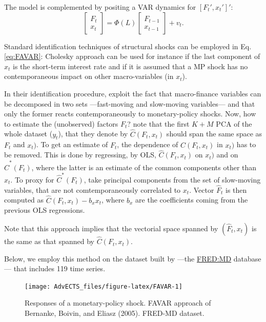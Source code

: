 \documentclass[
]{book}
\theoremstyle{definition}
\theoremstyle{definition}
\theoremstyle{definition}
\theoremstyle{definition}
\theoremstyle{remark}
\begin{document}
The model is complemented by positing a VAR dynamics for \([F_t',x_t']'\):
\begin{equation}
\left[\begin{array}{c}F_t\\x_t\end{array}\right] = \Phi(L)\left[\begin{array}{c}F_{t-1}\\ x_{t-1}\end{array}\right] + v_t.\label{eq:FAVAR}
\end{equation}

Standard identification techniques of structural shocks can be employed in Eq. \eqref{eq:FAVAR}: Cholesky approach can be used for instance if the last component of \(x_t\) is the short-term interest rate and if it is assumed that a MP shock has no contemporaneous impact on other macro-variables (in \(x_t\)).

In their identification procedure, \citet{Bernanke_Boivin_Eliasz_2005} exploit the fact that macro-finance variables can be decomposed in two sets ---fast-moving and slow-moving variables--- and that only the former reacts contemporaneously to monetary-policy shocks. Now, how to estimate the (unobserved) factors \(F_t\)? \citet{Bernanke_Boivin_Eliasz_2005} note that the first \(K+M\) PCA of the whole dataset (\(y_t\)), that they denote by \(\hat{C}(F_t,x_t)\) should span the same space as \(F_t\) and \(x_t)\). To get an estimate of \(F_t\), the dependence of \(\hat{C}(F_t,x_t)\) in \(x_t)\) has to be removed. This is done by regressing, by OLS, \(\hat{C}(F_t,x_t)\) on \(x_t)\) and on \(\hat{C}^*(F_t)\), where the latter is an estimate of the common components other than \(x_t\). To proxy for \(\hat{C}^*(F_t)\), \citet{Bernanke_Boivin_Eliasz_2005} take principal components from the set of slow-moving variables, that are not comtemporaneously correlated to \(x_t\). Vector \(\hat{F}_t\) is then computed as \(\hat{C}(F_t,x_t) - b_x x_t\), where \(b_x\) are the coefficients coming from the previous OLS regressions.

Note that this approach implies that the vectorial space spanned by \((\hat{F}_t,x_t)\) is the same as that spanned by \(\hat{C}(F_t,x_t)\).

Below, we employ this method on the dataset built by \citet{McCracken_Ng_2016} ---the \href{https://research.stlouisfed.org/wp/more/2015-012}{FRED:MD} database--- that includes 119 time series.

\begin{figure}
\texttt{[image: AdvECTS\_files/figure-latex/FAVAR-1]} \caption{Responses of a monetary-policy shock. FAVAR approach of Bernanke, Boivin, and Eliasz (2005). FRED-MD dataset.}\label{fig:FAVAR}
\end{figure}
\end{document}
